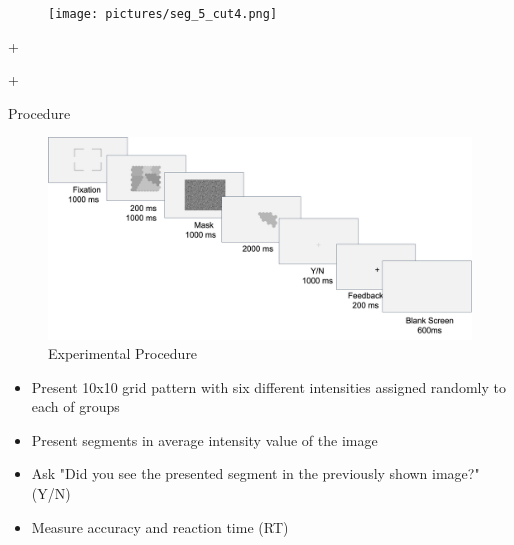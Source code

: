 \documentclass[10pt,xcolor=svgnames]{beamer} %
\begin{document}
\begin{frame}[standout]
\begin{figure}
    \centering
    \texttt{[image: pictures/seg\_5\_cut4.png]}
    \label{fig:exp_Seg}
\end{figure}
\end{frame}

\begin{frame}[standout]
+
\end{frame}

\begin{frame}[standout]
\color{black} +
\end{frame}

\begin{frame}[standout]
\end{frame}


\begin{frame}{Procedure}
\begin{figure}
\centering
    \includegraphics[width = \textwidth]{pictures/ExperimentalProcedure.png}   
\caption{\footnotesize Experimental Procedure}
\end{figure}

\begin{itemize}
    \footnotesize
    \item Present 10x10 grid pattern with six different intensities assigned randomly to each of groups 
    \item Present segments in average intensity value of the image
    \item Ask "Did you see the presented segment in the previously shown image?" (Y/N)
    \item Measure accuracy and reaction time (RT)

\end{itemize}
\end{frame}
\end{document}
